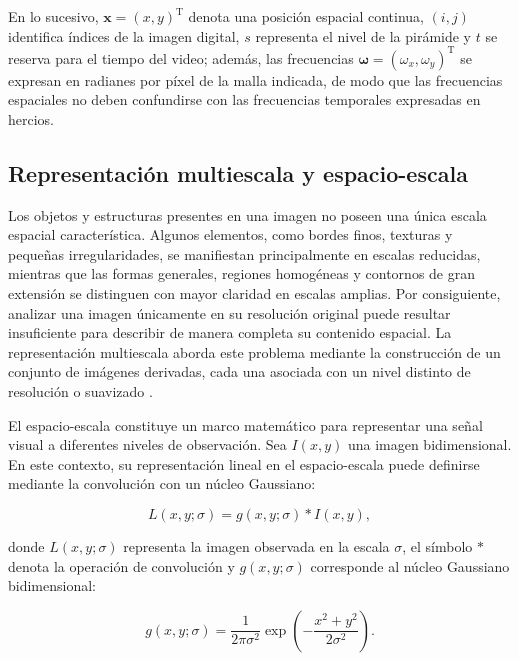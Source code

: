 En lo sucesivo, $\mathbf{x}=(x,y)^{\mathrm{T}}$ denota una posición espacial continua, $(i,j)$ identifica índices de la imagen digital, $s$ representa el nivel de la pirámide y $t$ se reserva para el tiempo del video; además, las frecuencias $\boldsymbol{\omega}=(\omega_x,\omega_y)^{\mathrm{T}}$ se expresan en radianes por píxel de la malla indicada, de modo que las frecuencias espaciales no deben confundirse con las frecuencias temporales expresadas en hercios.

	\subsection{Representación multiescala y espacio-escala}
	\label{subsubsec:representacion_multiescala_espacio_escala}

Los objetos y estructuras presentes en una imagen no poseen una única escala espacial característica. Algunos elementos, como bordes finos, texturas y pequeñas irregularidades, se manifiestan principalmente en escalas reducidas, mientras que las formas generales, regiones homogéneas y contornos de gran extensión se distinguen con mayor claridad en escalas amplias. Por consiguiente, analizar una imagen únicamente en su resolución original puede resultar insuficiente para describir de manera completa su contenido espacial. La representación multiescala aborda este problema mediante la construcción de un conjunto de imágenes derivadas, cada una asociada con un nivel distinto de resolución o suavizado \cite{lindeberg1994scalespace,ahmed2023overview}.

El espacio-escala constituye un marco matemático para representar una señal visual a diferentes niveles de observación. Sea $I(x,y)$ una imagen bidimensional. En este contexto, su representación lineal en el espacio-escala puede definirse mediante la convolución con un núcleo Gaussiano:

\begin{equation}
    L(x,y;\sigma)
    =
    g(x,y;\sigma)*I(x,y),
    \label{eq:espacio_escala}
\end{equation}

donde $L(x,y;\sigma)$ representa la imagen observada en la escala $\sigma$, el símbolo $*$ denota la operación de convolución y $g(x,y;\sigma)$ corresponde al núcleo Gaussiano bidimensional:

\begin{equation}
    g(x,y;\sigma)
    =
    \frac{1}{2\pi\sigma^2}
    \exp
    \left(
        -\frac{x^2+y^2}{2\sigma^2}
    \right).
    \label{eq:nucleo_gaussiano}
\end{equation}

